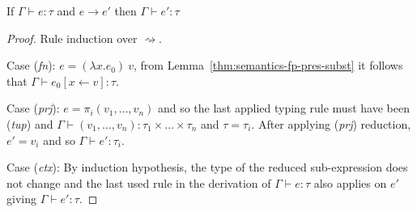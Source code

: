 \begin{theorem}
\label{thm:semantics-fp-pres}
  If $\Gamma \vdash e : \tau$ and $e \rightarrow e'$ then $\Gamma \vdash e' : \tau$
\end{theorem}
\begin{proof}
  Rule induction over $\rightsquigarrow$.

\vspace{0.25em}\noindent\hangindent=0.6cm
Case (\emph{fn}): $e = (\lambda x.e_0)~v$, from Lemma~\ref{thm:semantics-fp-pres-subst}
  it follows that $\Gamma \vdash e_0[x \leftarrow v] : \tau$.

\vspace{0.25em}\noindent\hangindent=0.6cm
Case (\emph{prj}): $e = \pi_i(v_1, \ldots, v_n)$ and so the last applied typing rule must have been
  (\emph{tup}) and $\Gamma \vdash (v_1, \ldots, v_n) : \tau_1 \times\ldots\times \tau_n$ and
  $\tau = \tau_i$. After applying (\emph{prj}) reduction, $e' = v_i$ and so $\Gamma \vdash e' : \tau_i$.

\vspace{0.25em}\noindent\hangindent=0.6cm
Case (\emph{ctx}): By induction hypothesis, the type of the reduced sub-expression does not change
  and the last used rule in the derivation of $\Gamma \vdash e : \tau$ also applies on $e'$
  giving $\Gamma \vdash e' : \tau$.
\end{proof}


